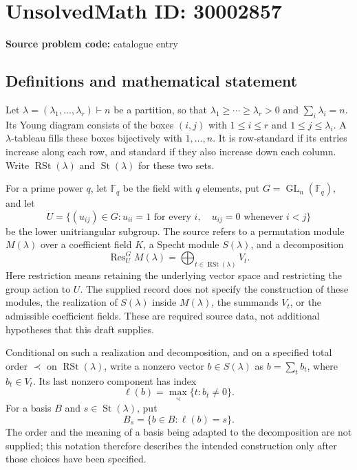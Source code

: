 \documentclass[11pt]{article}
\begin{document}
\section*{UnsolvedMath ID: 30002857}
\textbf{Source problem code:} catalogue entry
\subsection{Definitions and mathematical statement}
Let \(\lambda=(\lambda_1,\ldots,\lambda_r)\vdash n\) be a partition, so that \(\lambda_1\geq\cdots\geq\lambda_r>0\) and \(\sum_i\lambda_i=n\). Its Young diagram consists of the boxes \((i,j)\) with \(1\leq i\leq r\) and \(1\leq j\leq\lambda_i\). A \(\lambda\)-tableau fills these boxes bijectively with \(1,\ldots,n\). It is row-standard if its entries increase along each row, and standard if they also increase down each column. Write \(\operatorname{RSt}(\lambda)\) and \(\operatorname{St}(\lambda)\) for these two sets.

For a prime power \(q\), let \(\mathbb F_q\) be the field with \(q\) elements, put \(G=\operatorname{GL}_n(\mathbb F_q)\), and let
\[
U=\{(u_{ij})\in G:u_{ii}=1\text{ for every }i,\quad u_{ij}=0\text{ whenever }i<j\}
\]
be the lower unitriangular subgroup. The source refers to a permutation module \(M(\lambda)\) over a coefficient field \(K\), a Specht module \(S(\lambda)\), and a decomposition
\[
\operatorname{Res}^{G}_{U}M(\lambda)
=\bigoplus_{t\in\operatorname{RSt}(\lambda)}V_t.
\]
Here restriction means retaining the underlying vector space and restricting the group action to \(U\). The supplied record does not specify the construction of these modules, the realization of \(S(\lambda)\) inside \(M(\lambda)\), the summands \(V_t\), or the admissible coefficient fields. These are required source data, not additional hypotheses that this draft supplies.

Conditional on such a realization and decomposition, and on a specified total order \(\prec\) on \(\operatorname{RSt}(\lambda)\), write a nonzero vector \(b\in S(\lambda)\) as \(b=\sum_t b_t\), where \(b_t\in V_t\). Its last nonzero component has index
\[
\ell(b)=\max_{\prec}\{t:b_t\neq0\}.
\]
For a basis \(B\) and \(s\in\operatorname{St}(\lambda)\), put
\[
B_s=\{b\in B:\ell(b)=s\}.
\]
The order and the meaning of a basis being adapted to the decomposition are not supplied; this notation therefore describes the intended construction only after those choices have been specified.
\end{document}
